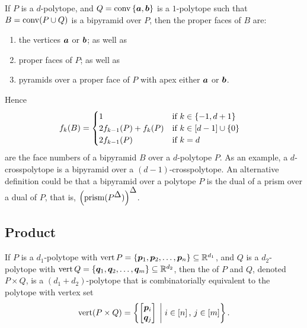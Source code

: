         If \(P\) is a \(d\)-polytope, and \(Q=\operatorname{conv}\left\{\bm{a},\bm{b}\right\}\) is a \(1\)-polytope such that \(B=\operatorname{conv}(P\cup Q)\) is a bipyramid over \(P\), then the proper faces of \(B\) are:
            \begin{enumerate}
                \item   the vertices \(\bm{a}\) or \(\bm{b}\); as well as
                \item   proper faces of \(P\); as well as
                \item   pyramids over a proper face of \(P\) with apex either \(\bm{a}\) or \(\bm{b}\).
            \end{enumerate}
        Hence
            \begin{align*}
                f_k(B)
                    &=  \begin{cases}
                            1                               &\text{if }k\in\left\{-1,d+1\right\}\\
                            2f_{k-1}(P)+f_k(P)              &\text{if }k\in\left[d-1\right]\cup\left\{0\right\}\\
                            2f_{k-1}(P)                     &\text{if }k=d\\
                        \end{cases}
            \end{align*}
        are the face numbers of a bipyramid \(B\) over a \(d\)-polytope \(P\).  As an example, a \(d\)-crosspolytope is a bipyramid over a \((d-1)\)-crosspolytope.  An alternative definition could be that a bipyramid over a polytope \(P\) is the dual of a prism over a dual of \(P\), that is, \(\left(\prism(P^{\tri})\right)^{\tri}\).
    \subsection{Product}
        If \(P\) is a \(d_1\)-polytope with \(\operatorname{vert} P=\left\{\bm{p}_1,\bm{p}_2,\dotsc,\bm{p}_n\right\}\subseteq\mathbb{R}^{d_1}\), and \(Q\) is a \(d_2\)-polytope with \(\operatorname{vert} Q=\left\{\bm{q}_1,\bm{q}_2,\dotsc,\bm{q}_m\right\}\subseteq\mathbb{R}^{d_2}\), then the  of \(P\) and \(Q\), denoted \(P\times Q\), is a \((d_1+d_2)\)-polytope that is combinatorially equivalent to the polytope with vertex set
            \[
                \vrt(P\times Q)
                    =   \setb{\begin{bmatrix}\ve p_i\\ \ve q_j\end{bmatrix}}{i\in\brac n\text{, }j\in\brac m}.
            \]

